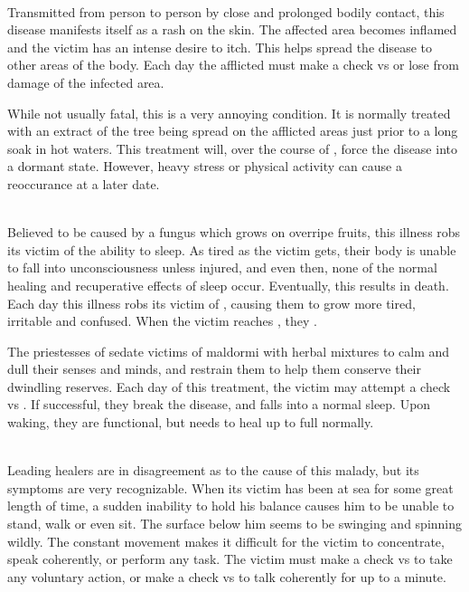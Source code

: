 \begin{multicols}{2}
\\
Transmitted from person to person by close and prolonged bodily contact, this disease manifests itself as a rash on the skin. The affected area becomes inflamed and the victim has an intense desire to itch. This helps spread the disease to other areas of the body. Each day the afflicted must make a  check vs \WIL or lose  from damage of the infected area. 

While not usually fatal, this is a very annoying condition. It is normally treated with an extract of the  tree being spread on the afflicted areas just prior to a long soak in hot waters. This treatment will, over the course of , force the disease into a dormant state. However, heavy stress or physical activity can cause a reoccurance at a later date.

\\
Believed to be caused by a fungus which grows on overripe fruits, this illness robs its victim of the ability to sleep. As tired as the victim gets, their body is unable to fall into unconsciousness unless injured, and even then, none of the normal healing and recuperative effects of sleep occur. Eventually, this results in death. Each day this illness robs its victim of   \DP, causing them to grow more tired, irritable and confused. When the victim reaches \tcdefine{0 \DP}, they .

The priestesses of  sedate victims of maldormi with herbal mixtures to calm and dull their senses and minds, and restrain them to help them conserve their dwindling reserves. Each day of this treatment, the victim may attempt a  check vs \HEA. If successful, they break the disease, and falls into a normal sleep. Upon waking, they are functional, but needs to heal up to full normally.

\\
Leading healers are in disagreement as to the cause of this malady, but its symptoms are very recognizable. When its victim has been at sea for some great length of time, a sudden inability to hold his balance causes him to be unable to stand, walk or even sit. The surface below him seems to be swinging and spinning wildly. The constant movement makes it difficult for the victim to concentrate, speak coherently, or perform any task. The victim must make a  check vs \WIL to take any voluntary action, or make a  check vs \WIL to talk coherently for up to a minute.


\end{multicols}
